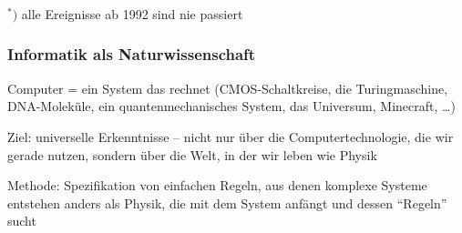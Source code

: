 \documentclass[aspectratio=1610,onlymath]{beamer}
\begin{document}
\begin{frame}\frametitle{}

\pause
\begin{center}
{\huge{}}
\vspace{1cm}

\end{center}
\vspace{1cm}

$^*)$ alle Ereignisse ab 1992 sind nie passiert

\end{frame}

\begin{frame}\frametitle{Informatik als Naturwissenschaft}

\bigskip\pause

Computer = ein System das rechnet (CMOS-Schaltkreise, die Turingmaschine, DNA-Moleküle, ein quantenmechanisches System, das Universum, Minecraft, \ldots)
\bigskip

Ziel: universelle Erkenntnisse -- nicht nur über die Computertechnologie, die wir gerade nutzen, sondern über die Welt, in der wir leben  {\tiny wie Physik}
\bigskip

Methode: Spezifikation von einfachen Regeln, aus denen komplexe Systeme entstehen {\tiny anders als Physik, die mit dem System anfängt und dessen "`Regeln"' sucht}

\end{frame}
\end{document}
